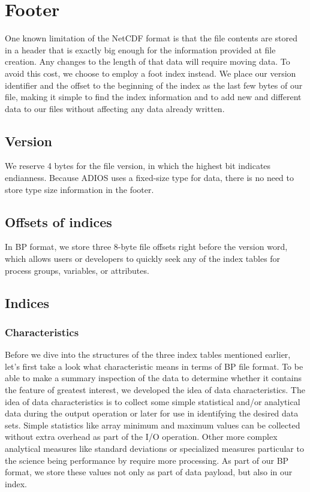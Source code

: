 \section{Footer}

One known limitation of the NetCDF format is that the file contents are stored 
in a header that is exactly big enough for the information provided at file creation. 
Any changes to the length of that data will require moving data. To avoid this 
cost, we choose to employ a foot index instead. We place our version identifier 
and the offset to the beginning of the index as the last few bytes of our file, 
making it simple to find the index information and to add new and different data 
to our files without affecting any data already written. \label{HToc84890271}\label{HToc212016647}\label{HToc212016889}\label{HToc182553418}

\subsection{Version}

We reserve 4 bytes for the file version, in which the highest bit indicates endianness. 
Because ADIOS uses a fixed-size type for data, there is no need to store type size 
information in the footer. 

\subsection{Offsets of indices}

In BP format, we store three 8-byte file offsets right before the version word, 
which allows users or developers to quickly seek any of the index tables for process 
groups, variables, or attributes. 

\subsection{Indices}

\subsubsection{Characteristics}

Before we dive into the structures of the three index tables mentioned earlier, 
let's first take a look what characteristic means in terms of BP file format. To 
be able to make a summary inspection of the data to determine whether it contains 
the feature of greatest interest, we developed the idea of data characteristics. 
The idea of data characteristics is to collect some simple statistical and/or analytical 
data during the output operation or later for use in identifying the desired data 
sets. Simple statistics like array minimum and maximum values can be collected 
without extra overhead as part of the I/O operation. Other more complex analytical 
measures like standard deviations or specialized measures particular to the science 
being performance by require more processing. As part of our BP format, we store 
these values not only as part of data payload, but also in our index. 

